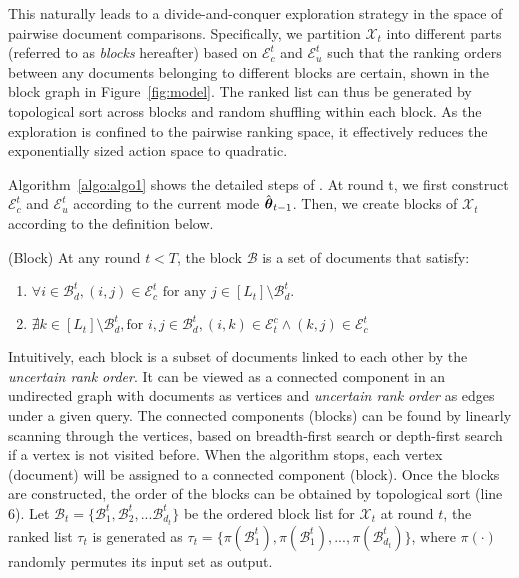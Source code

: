 This naturally leads to a divide-and-conquer exploration strategy in the space of pairwise document comparisons. Specifically, we partition $\mathcal{X}_t$ into different parts (referred to as \textit{blocks} hereafter) based on $\mathcal{E}_c^t$ and $\mathcal{E}_{u}^t$ such that the ranking orders between any documents belonging to different blocks are certain, shown in the block graph in Figure~\ref{fig:model}. The ranked list can thus be generated by topological sort across blocks and random shuffling within each block. As the exploration is confined to the pairwise ranking space, it effectively reduces the exponentially sized action space to quadratic. 

Algorithm~\ref{algo:algo1} shows the detailed steps of \model{}. At round t, we first construct $\mathcal{E}_c^t$ and $\mathcal{E}_u^t$ according to the current mode $\hat{\boldsymbol{\theta}}_{t-1}$. Then, we create blocks of $\mathcal{X}_t$ according to the definition below.

\begin{definition} (Block)
At any round $t < T$, the block $\mathcal{B}$ is a set of documents that satisfy: 
\begin{enumerate}[nolistsep]
    \item $\forall i \in \mathcal{B}_d^t, (i, j) \in \mathcal{E}_c^t \text{ for any } j\in[L_t]\setminus \mathcal{B}_d^t.$ 
    \item $\nexists k \in [L_t] \setminus \mathcal{B}_d^t,  \text{for } i, j \in \mathcal{B}_d^t, (i, k) \in \mathcal{E}_t^c \wedge (k, j) \in \mathcal{E}_c^t$
\end{enumerate}
\end{definition}

Intuitively, each block is a subset of documents linked to each other by the \textit{uncertain rank order}. It can be viewed as a connected component in an undirected graph with documents as vertices and \textit{uncertain rank order} as edges under a given query. The connected components (blocks) can be found by linearly scanning through the vertices, based on breadth-first search or depth-first search if a vertex is not visited before. When the algorithm stops, each vertex (document) will be assigned to a connected component (block). Once the blocks are constructed, the order of the blocks can be obtained by topological sort (line 6). Let $\mathcal{B}_t = \{\mathcal{B}_1^t, \mathcal{B}_2^t, ... \mathcal{B}_{d_t}^t\}$ be the ordered block list for $\mathcal{X}_t$ at round $t$, the ranked list $\tau_t$ is generated as $\tau_t = \{\pi(\mathcal{B}_1^t), \pi(\mathcal{B}_1^t), ... , \pi(\mathcal{B}_{d_t}^t) \}$, where $\pi(\cdot)$ randomly permutes its input set as output.



